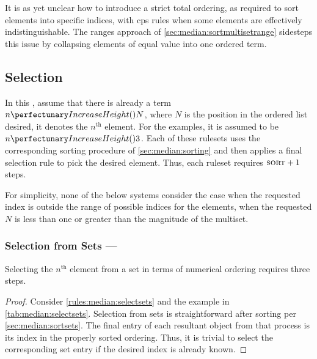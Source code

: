 It is as yet unclear how to introduce a strict total ordering, as required to sort elements into specific indices, with \gls{cps} rules when some elements are effectively indistinguishable.  The ranges approach of \cref{sec:median:sortmultisetrange} sidesteps this issue by collapsing elements of equal value into one ordered term.

\subsection{Selection}\label{sec:median:selection}

In this , assume that there is already a term \(\cpfunc{n}{N}\), where \(N\) is the position in the ordered list desired, \ie{} it denotes the \(n^{\text{th}}\) element.  For the examples, it is assumed to be \(\cpfunc{n}{3}\).  Each of these \glspl{ruleset} uses the corresponding sorting procedure of \cref{sec:median:sorting} and then applies a final selection rule to pick the desired element.  Thus, each \gls{ruleset} requires \(\textsc{sort} + 1\) steps.

For simplicity, none of the below systems consider the case when the requested index is outside the range of possible indices for the elements, \ie{} when the requested \(N\) is less than one or greater than the magnitude of the multiset.

\subsubsection{Selection from Sets --- }\label{sec:median:selectsets}

\begin{proposition}\label{prop:median:selectsets}
Selecting the \(n^{\text{th}}\) element from a set in terms of numerical ordering requires three steps.
\end{proposition}

\begin{proof}
Consider \cref{rules:median:selectsets} and the example in \cref{tab:median:selectsets}.  Selection from sets is straightforward after sorting per \cref{sec:median:sortsets}.  The final entry of each resultant object from that process is its index in the properly sorted ordering.  Thus, it is trivial to select the corresponding set entry if the desired index is already known.
\end{proof}

